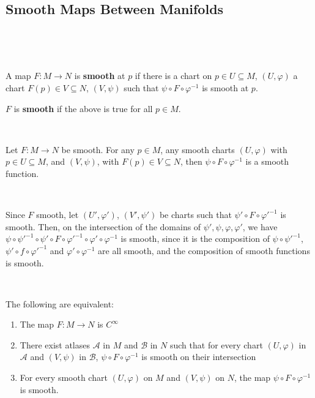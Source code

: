 \documentclass{article}
\begin{document}
\subsection{Smooth Maps Between Manifolds}
\

\begin{definition}
  \

  A map $F: M \to N$ is \textbf{smooth} at $p$ if there is a chart on $p \in U \subseteq M$, $(U, \varphi)$ a chart $F(p) \in V \subseteq N$, $(V, \psi)$ such that $\psi \circ F \circ \varphi ^{-1}$ is smooth at $p$.

  $F$ is \textbf{smooth} if the above is true for all $p \in M$.
\end{definition}

\begin{proposition}
  \

  Let $F: M \to N$ be smooth. For any $p \in M$, any smooth charts $(U, \varphi)$ with $p \in U \subseteq M$, and $(V, \psi)$, with $F(p) \in V \subseteq N$, then $\psi \circ F \circ \varphi ^{-1}$ is a smooth function.
\end{proposition}

\begin{customproof}
  \

  Since $F$ smooth, let $(U', \varphi')$, $(V', \psi')$ be charts such that $\psi' \circ F \circ {\varphi'} ^{-1}$ is smooth. Then, on the intersection of the domains of $\psi', \psi, \varphi, \varphi'$, we have $\psi \circ {\psi'} ^{-1} \circ \psi' \circ F \circ {\varphi'} ^{-1} \circ \varphi' \circ \varphi ^{-1}$ is smooth, since it is the composition of $\psi \circ {\psi'} ^{-1}$, $\psi' \circ f \circ {\varphi'} ^{-1}$ and $\varphi' \circ \varphi ^{-1}$ are all smooth, and the composition of smooth functions is smooth.
\end{customproof}

\begin{proposition}
  \

  The following are equivalent:

  \begin{enumerate}
    \item The map $F: M \to N$ is $C^\infty$
    \item There exist atlases $\mathcal{A}$ in $M$ and $\mathcal{B}$ in $N$ such that for every chart $(U, \varphi)$ in $\mathcal{A}$ and $(V, \psi)$ in $\mathcal{B}$, $\psi \circ F \circ \varphi ^{-1}$ is smooth on their intersection
    \item For every smooth chart $(U, \varphi)$ on $M$ and $(V, \psi)$ on $N$, the map $\psi \circ F \circ \varphi ^{-1}$ is smooth.
  \end{enumerate}
\end{proposition}
\end{document}
